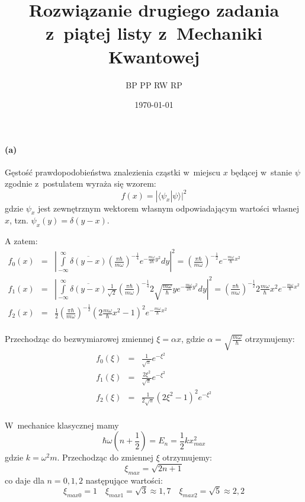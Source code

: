 \documentclass{article}
\title{Rozwiązanie drugiego zadania z~piątej listy z~Mechaniki Kwantowej}
\author{BP PP RW RP}
\date{\today}
\begin{document}
\maketitle

\paragraph{(a)}

Gęstość prawdopodobieństwa znalezienia cząstki w~miejscu $x$ będącej w~stanie $\psi$
zgodnie z~postulatem wyraża się wzorem:
\[
f(x) = |\langle\psi_x|\psi\rangle|^2
\]
gdzie $\psi_x$ jest zewnętrznym wektorem własnym odpowiadającym wartości własnej $x$, tzn.
$\psi_x(y) = \delta(y - x)$.

A zatem:
\begin{eqnarray*}
f_0(x) & = & \left|\int\limits_{-\infty}^\infty \overline{\delta(y - x)}
	\left(\frac{\pi\hbar}{m\omega}\right)^{-\frac{1}{4}}e^{-\frac{m\omega}{2\hbar}y^2}dy
	\right|^2 =
	\left(\frac{\pi\hbar}{m\omega}\right)^{-\frac{1}{2}}e^{-\frac{m\omega}{\hbar}x^2} \\
f_1(x) & = & \left|\int\limits_{-\infty}^\infty \overline{\delta(y - x)}
	\frac{1}{\sqrt{2}}\left(\frac{\pi\hbar}{m\omega}\right)^{-\frac{1}{4}}
	2\sqrt{\frac{m\omega}{\hbar}}ye^{-\frac{m\omega}{2\hbar}y^2}dy\right|^2 =
	\left(\frac{\pi\hbar}{m\omega}\right)^{-\frac{1}{2}}2\frac{m\omega}{\hbar}x^2
	e^{-\frac{m\omega}{\hbar}x^2} \\
f_2(x) & = & \frac{1}{2}\left(\frac{\pi\hbar}{m\omega}\right)^{-\frac{1}{2}}
	\left(2\frac{m\omega}{\hbar}x^2 - 1\right)^2e^{-\frac{m\omega}{\hbar}x^2} \\
\end{eqnarray*}

Przechodząc do bezwymiarowej zmiennej $\xi=\alpha{}x$, 
gdzie $\alpha=\sqrt{\frac{m\omega}{\hbar}}$ otrzymujemy:
\begin{eqnarray*}
f_0(\xi) & = & \frac{1}{\sqrt{\pi}}e^{-\xi^2} \\
f_1(\xi) & = & \frac{2\xi^2}{\sqrt{\pi}}e^{-\xi^2} \\
f_2(\xi) & = & \frac{1}{2\sqrt{\pi}}\left(2\xi^2 - 1\right)^2e^{-\xi^2} \\
\end{eqnarray*}

W~mechanice klasycznej mamy
\[
\hbar\omega(n+\frac{1}{2}) = E_n = \frac{1}{2}kx_{max}^2
\]
gdzie $k = \omega^2m$. Przechodząc do zmiennej $\xi$ otrzymujemy:
\[
\xi_{max} = \sqrt{2n + 1}
\]
co daje dla $n=0,1,2$ następujące wartości:
\[
\xi_{max0} = 1 \quad \xi_{max1} = \sqrt{3} \approx 1,7 \quad 
\xi_{max2} = \sqrt{5} \approx 2,2
\]
\end{document}
